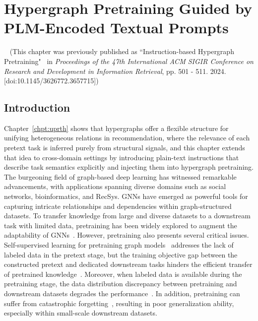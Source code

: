 \chapter{Hypergraph Pretraining Guided by PLM-Encoded Textual Prompts}~\label{chpt:ihp}
(This chapter was previously published as ``Instruction-based Hypergraph Pretraining"~\cite{ihp} in \textit{Proceedings of the 47th International ACM SIGIR Conference on Research and Development in Information Retrieval}, pp. 501 - 511. 2024. [doi:10.1145/3626772.3657715])

\section{Introduction}
Chapter~\ref{chpt:uprth} shows that hypergraphs offer a flexible structure for unifying heterogeneous relations in recommendation, where the relevance of each pretext task is inferred purely from structural signals, and this chapter extends that idea to cross-domain settings by introducing plain-text instructions that describe task semantics explicitly and injecting them into hypergraph pretraining.
The burgeoning field of graph-based deep learning has witnessed remarkable advancements, with applications spanning diverse domains such as social networks, bioinformatics, and RecSys.
GNNs have emerged as powerful tools for capturing intricate relationships and dependencies within graph-structured datasets. 
To transfer knowledge from large and diverse datasets to a downstream task with limited data, pretraining has been widely explored to augment the adaptability of GNNs~\cite{gptgnn, gcc}. 
However, pretraining also presents several critical issues.
Self-supervised learning for pretraining graph models~\cite{gcc, weihua20} addresses the lack of labeled data in the pretext stage, but the training objective gap between the constructed pretext and dedicated downstream tasks hinders the efficient transfer of pretrained knowledge~\cite{gppt}. 
Moreover, when labeled data is available during the pretraining stage, the data distribution discrepancy between pretraining and downstream datasets degrades the performance~\cite{afec}. 
In addition, pretraining can suffer from catastrophic forgetting~\cite{forgetting}, resulting in poor generalization ability, especially within small-scale downstream datasets.


